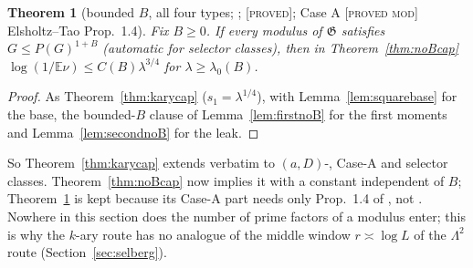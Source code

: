 \documentclass[10pt,reqno]{amsart}
\newtheorem{theorem}{Theorem}[section]
\theoremstyle{definition}
\theoremstyle{remark}
\newcommand{\cG}{\mathfrak G}
\newcommand{\E}{\mathbb E}
\newcommand{\lab}[1]{\textup{[\textsc{#1}]}}
\begin{document}
\begin{theorem}[bounded $B$, all four types; {\cite[Thm~5.2]{KA2}}; \lab{proved}; Case A \lab{proved mod} Elsholtz--Tao Prop.~1.4]\label{thm:Bcapall}
Fix $B\geq0$.  If every modulus of $\cG$ satisfies $G\leq P(G)^{1+B}$
(automatic for selector classes), then in Theorem~\ref{thm:noBcap}
$\log(1/\E\nu)\leq C(B)\lambda^{3/4}$ for $\lambda\geq\lambda_0(B)$.
\end{theorem}
\begin{proof}
As Theorem~\ref{thm:karycap} ($s_1=\lambda^{1/4}$), with
Lemma~\ref{lem:squarebase} for the base, the bounded-$B$ clause of
Lemma~\ref{lem:firstnoB} for the first moments and
Lemma~\ref{lem:secondnoB} for the leak.
\end{proof}
So Theorem~\ref{thm:karycap} extends verbatim to $(a,D)$-, Case-A and
selector classes.  Theorem~\ref{thm:noBcap} now implies it with a
constant independent of $B$; Theorem~\ref{thm:Bcapall} is kept because
its Case-A part needs only Prop.~1.4 of \cite{ElsholtzTao}, not
\cite[\S7]{ElsholtzTao}.  Nowhere in this section does the number of
prime factors of a modulus enter; this is why the $k$-ary route has no
analogue of the middle window $r\asymp\log L$ of the $\Lambda^2$ route
(Section~\ref{sec:selberg}).
\end{document}
